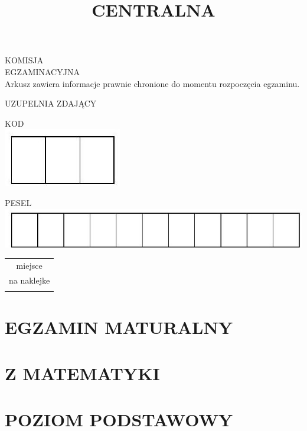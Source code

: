 \documentclass[10pt]{article}
\title{CENTRALNA }
\author{}
\date{}
\begin{document}
\maketitle
KOMISJA\\
EGZAMINACYJNA\\
Arkusz zawiera informacje prawnie chronione do momentu rozpoczęcia egzaminu.

UZUPELNIA ZDAJĄCY

KOD\\
\includegraphics[max width=\textwidth, center]{2024_11_21_d51d653f4fe4a5bb0c33g-01}

PESEL\\
\includegraphics[max width=\textwidth, center]{2024_11_21_d51d653f4fe4a5bb0c33g-01(1)}

\begin{center}
\begin{tabular}{c}
 \\
miejsce \\
na naklejke \\
 \\
\hline
\end{tabular}
\end{center}

\section*{EGZAMIN MATURALNY}
\section*{Z MATEMATYKI}
\section*{POZIOM PODSTAWOWY}
\end{document}
